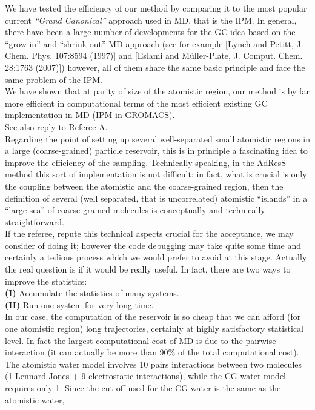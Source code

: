 \documentclass[12pt,a4paper]{article}
\newcommand{\bluec}[1]{{\color{blue} #1}}
\begin{document}
We have tested the efficiency of our method by comparing it to the most popular current {\it ``Grand Canonical''} approach used in MD, that is the {IPM}.
In general, there have been a large number of developments for the GC idea based on the ``grow-in'' and ``shrink-out'' MD approach (see for example [Lynch and Petitt, J. Chem. Phys. 107:8594 (1997)] and [Eslami and M\"uller-Plate,
  J. Comput. Chem. 28:1763 (2007)]) however, all of them  share the same basic principle and face the same problem
  of the IPM.
\\
We have shown that at parity of size of the atomistic region, our method is by far more efficient in computational terms of the most efficient existing GC implementation in MD (IPM in GROMACS).\\
See also reply to Referee A.\\
Regarding the point of setting up several  well-separated small atomistic regions in a large (coarse-grained) particle reservoir, this is in principle
  a fascinating idea to improve the efficiency of the sampling. Technically speaking, in the AdResS method this sort of implementation is not difficult;
in fact, what is crucial is only the coupling between the atomistic and the coarse-grained region, then the definition of several (well separated, that is uncorrelated)
atomistic ``islands'' in a ``large sea'' of coarse-grained molecules is conceptually and technically straightforward.\\
If the referee, repute this technical aspects crucial for the acceptance, we may consider of doing it; however the code debugging may take quite some time and certainly a tedious process which we would prefer to avoid at this stage.
Actually the real question is if it would be really useful.
In fact, there are two ways to improve the statistics:\\
{\bf (I)} Accumulate the statistics of many systems.\\
{\bf (II)} Run one system for very long time.\\
In our case, the computation of the reservoir is so cheap that we can afford (for one atomistic region) long trajectories, certainly at highly satisfactory statistical level. In fact \bluec{the
  largest computational cost of MD} is due to the pairwise interaction (it can actually be more than 90\% of the total computational cost).
  The atomistic water model involves 10 pairs interactions between two molecules (1 Lennard-Jones + 9 electrostatic interactions),
  while the CG water model requires only 1. Since the cut-off used for the CG water is the same as the atomistic water,
\end{document}
